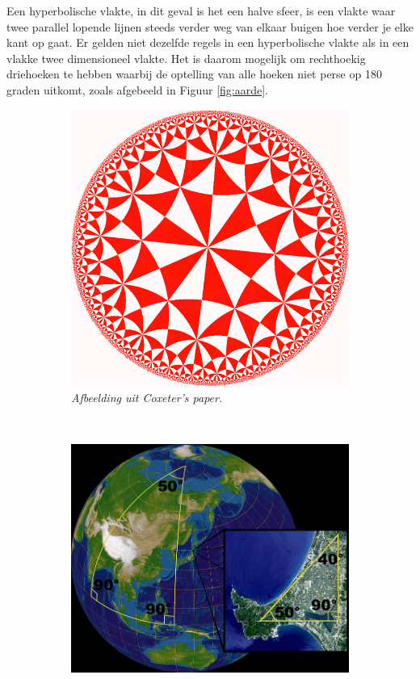 \documentclass{article}
\begin{document}
Een hyperbolische vlakte, in dit geval is het een halve sfeer, is een vlakte waar twee parallel lopende lijnen steeds verder weg van elkaar buigen hoe verder je elke kant op gaat. Er gelden niet dezelfde regels in een hyperbolische vlakte als in een vlakke twee dimensioneel vlakte. Het is daarom mogelijk om rechthoekig driehoeken te hebben waarbij de optelling van alle hoeken niet perse op 180 graden uitkomt, zoals afgebeeld in Figuur \ref{fig:aarde}.

\begin{figure}[h]
        \centering
        \begin{subfigure}{0.5\textwidth}
            \includegraphics[width=\textwidth]{hyperbolic_domains}
            \caption{\textit{Afbeelding uit Coxeter's paper.}}
			\label{fig:hyperbolic-domains}
        \end{subfigure}%
       	~ 
        \begin{subfigure}{0.6\textwidth}
			\includegraphics[width=\textwidth]{aarde}

\end{subfigure}
\end{figure}
\end{document}
